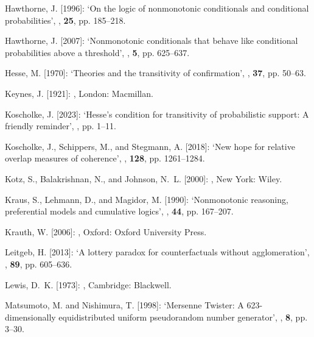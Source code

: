 \documentclass[a4paper,11pt]{article}
\begin{document}
\begin{thebibliography}{}
Hawthorne, J. [1996]:
\newblock `On the logic of nonmonotonic conditionals and conditional
  probabilities',
, \textbf{25}, pp. 185--218.

Hawthorne, J. [2007]:
\newblock `Nonmonotonic conditionals that behave like conditional probabilities
  above a threshold',
, \textbf{5}, pp. 625--637.

Hesse, M. [1970]:
\newblock `Theories and the transitivity of confirmation',
, \textbf{37}, pp. 50--63.

Keynes, J. [1921]:
,
\newblock London: Macmillan.

Koscholke, J. [2023]:
\newblock `Hesse's condition for transitivity of probabilistic support: A
  friendly reminder',
, pp. 1--11.

Koscholke, J., Schippers, M., and Stegmann, A. [2018]:
\newblock `New hope for relative overlap measures of coherence',
, \textbf{128}, pp. 1261--1284.

Kotz, S., Balakrishnan, N., and Johnson, N.~L. [2000]:
,
\newblock New York: Wiley.

Kraus, S., Lehmann, D., and Magidor, M. [1990]:
\newblock `Nonmonotonic reasoning, preferential models and cumulative logics',
, \textbf{44}, pp. 167--207.

Krauth, W. [2006]:
,
\newblock  Oxford: Oxford University Press.

Leitgeb, H. [2013]:
\newblock `A lottery paradox for counterfactuals without agglomeration',
, \textbf{89}, pp. 605--636.

Lewis, D.~K. [1973]:
,
\newblock Cambridge: Blackwell.

Matsumoto, M. and Nishimura, T. [1998]:
\newblock `Mersenne {T}wister: A 623-dimensionally equidistributed uniform
  pseudorandom number generator',
,
  \textbf{8}, pp. 3--30.


\end{thebibliography}
\end{document}

